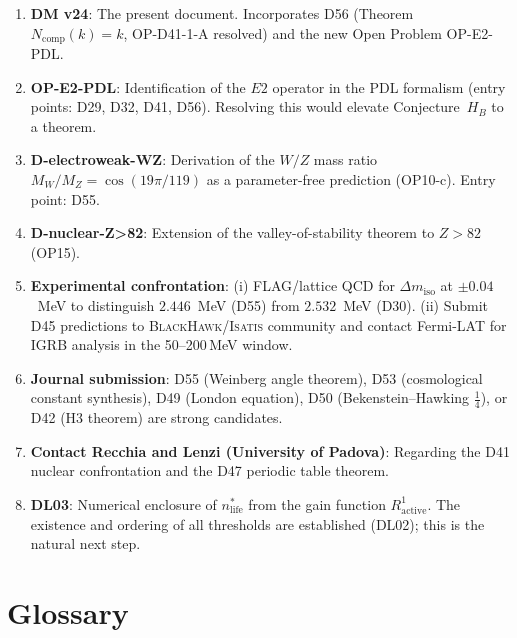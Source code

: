 \documentclass[11pt,a4paper]{article}
\theoremstyle{plain}
\theoremstyle{definition}
\theoremstyle{remark}
\begin{document}
\begin{enumerate}
\item \textbf{DM v24}: The present document. Incorporates D56 (Theorem~$N_{\mathrm{comp}}(k)=k$, OP-D41-1-A resolved) and the new Open Problem OP-E2-PDL.
\item \textbf{OP-E2-PDL}: Identification of the $E2$ operator in the PDL formalism (entry points: D29, D32, D41, D56). Resolving this would elevate Conjecture~$H_B$ to a theorem.
\item \textbf{D-electroweak-WZ}: Derivation of the $W/Z$ mass ratio $M_W/M_Z = \cos(19\pi/119)$ as a parameter-free prediction (OP10-c). Entry point: D55.
\item \textbf{D-nuclear-Z>82}: Extension of the valley-of-stability theorem to $Z>82$ (OP15).
\item \textbf{Experimental confrontation}: (i) FLAG/lattice QCD for $\Delta m_{\mathrm{iso}}$ at $\pm 0.04$~MeV to distinguish $2.446$~MeV (D55) from $2.532$~MeV (D30). (ii) Submit D45 predictions to \textsc{BlackHawk}/\textsc{Isatis} community and contact Fermi-LAT for IGRB analysis in the 50--200\,MeV window.
\item \textbf{Journal submission}: D55 (Weinberg angle theorem), D53 (cosmological constant synthesis), D49 (London equation), D50 (Bekenstein--Hawking $\tfrac{1}{4}$), or D42 (H3 theorem) are strong candidates.
\item \textbf{Contact Recchia and Lenzi (University of Padova)}: Regarding the D41 nuclear confrontation and the D47 periodic table theorem.
\item \textbf{DL03}: Numerical enclosure of $n^*_{\mathrm{life}}$ from the gain function $R^1_{\mathrm{active}}$. The existence and ordering of all thresholds are established (DL02); this is the natural next step.
\end{enumerate}

\section{Glossary}
\label{sec:glossary}
\end{document}
